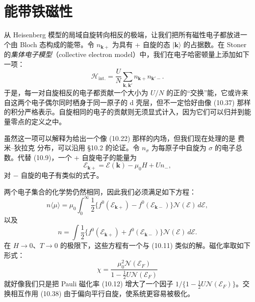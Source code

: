 \section{能带铁磁性}

从 Heisenberg 模型的局域自旋转向相反的极端，让我们把所有磁性电子都放进一个由 Bloch 态构成的能带。令 $n_{\mathbf{k}+}$ 为具有 + 自旋的态 $|\mathbf{k}\rangle$ 的占据数。在 Stoner 的\emph{集体电子模型}（collective electron model）中，我们在电子哈密顿量上添加如下一项：
\begin{equation*}
\mathcal{H}_{\mathrm{int.}}=\frac{U}{N}\sum_{\mathbf{k},\mathbf{k}'}n_{\mathbf{k}+}n_{\mathbf{k}'-}.
\tag{10.38}
\end{equation*}
于是，每一对自旋相反的电子都贡献一个大小为 $U/N$ 的正的“交换”能，它或许来自这两个电子偶尔同时栖身于同一原子的 d 壳层，但不一定恰好由像 (10.37) 那样的积分严格表示。自旋相同的电子的贡献则无须显式计入，因为它们可以归并到能量零点的定义之中。

虽然这一项可以解释为给出一个像 (10.22) 那样的内场，但我们现在处理的是 费米–狄拉克 分布，可以沿用 §10.2 的论证。令 $n_{\sigma}$ 为每原子中自旋为 $\sigma$ 的电子总数。代替 (10.9)，一个 + 自旋电子的能量为
\begin{equation*}
\mathcal{E}_{\mathbf{k}+}=\mathcal{E}(\mathbf{k})-\mu_{0}H+Un_{-},
\tag{10.39}
\end{equation*}
对 $-$ 自旋的电子有类似的式子。

两个电子集合的化学势仍然相同，因此我们必须满足如下方程：
\begin{equation*}
n\langle\mu\rangle=\mu_{0}\int_{0}^{\infty}\frac{1}{2}\bigl\{f^{0}(\mathcal{E}_{\mathbf{k}+})-f^{0}(\mathcal{E}_{\mathbf{k}-})\bigr\}\mathcal{N}(\mathcal{E})\,d\mathcal{E},
\tag{10.40}
\end{equation*}
以及
\begin{equation*}
n=\int\frac{1}{2}\bigl\{f^{0}(\mathcal{E}_{\mathbf{k}+})+f^{0}(\mathcal{E}_{\mathbf{k}-})\bigr\}\mathcal{N}(\mathcal{E})\,d\mathcal{E}.
\tag{10.41}
\end{equation*}
在 $H\to 0$、$T\to 0$ 的极限下，这些方程有一个与 (10.11) 类似的解。磁化率取如下形式：
\begin{equation*}
\chi=\frac{\mu_{0}^{2}\mathcal{N}(\mathcal{E}_{F})}{1-\frac{1}{2}U\mathcal{N}(\mathcal{E}_{F})}
\tag{10.42}
\end{equation*}
就好像我们只是把 Pauli 磁化率 (10.12) 增大了一个因子 $1/\{1-\frac{1}{2}U\mathcal{N}(\mathcal{E}_{F})\}$。交换相互作用 (10.38) 由于偏向平行自旋，使系统更容易被极化。


